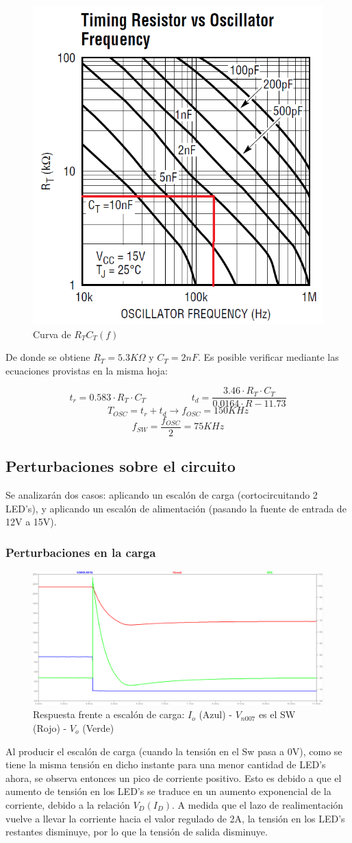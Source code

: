 \documentclass[e4_tp2_main.tex]{subfiles}
\begin{document}
\begin{figure}[H]
\centering
\includegraphics[width=0.3\linewidth]{Imagenes/Punto2/RT-OSC.png}
\caption{Curva de $R_TC_T(f)$}
\end{figure}

De donde se obtiene $R_T = 5.3K\Omega$ y $C_T = 2nF$. Es posible verificar mediante las ecuaciones provistas en la misma hoja:

\[
t_r = 0.583 \cdot R_T \cdot C_T \hspace{2cm} t_d = \frac{3.46 \cdot R_T \cdot C_T}{0.0164 \cdot R - 11.73}
\]
\[
T_{OSC} = t_r + t_d \longrightarrow f_{OSC} = 150KHz
\]
\[
f_{SW} = \frac{f_{OSC}}{2} = 75KHz
\]

\subsection*{Perturbaciones sobre el circuito}
Se analizarán dos casos: aplicando un escalón de carga (cortocircuitando 2 LED's), y aplicando un escalón de alimentación (pasando la fuente de entrada de 12V a 15V).
\subsubsection*{Perturbaciones en la carga}
\begin{figure}[H]
\centering
\includegraphics[width=0.8\linewidth]{Imagenes/Punto2/Carga.PNG}
\caption{Respuesta frente a escalón de carga: $I_o$ (Azul) - $V_{n007}$ es el SW (Rojo) - $V_o$ (Verde)}
\end{figure}

Al producir el escalón de carga (cuando la tensión en el Sw pasa a 0V), como se tiene la misma tensión en dicho instante para una menor cantidad de LED's ahora, se observa entonces un pico de corriente positivo. Esto es debido a que el aumento de tensión en los LED's se traduce en un aumento exponencial de la corriente, debido a la relación $V_D(I_D)$. A medida que el lazo de realimentación vuelve a llevar la corriente hacia el valor regulado de 2A, la tensión en los LED's restantes disminuye, por lo que la tensión de salida disminuye. 
\end{document}
